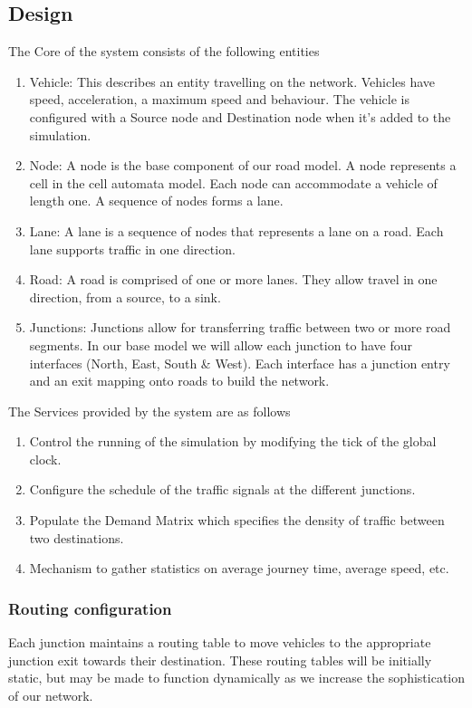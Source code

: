 \documentclass[11pt]{article}
\begin{document}
	\subsection{Design}
		\label{secarch}
	The Core of the system consists of the following entities
	\begin{enumerate}
		\item Vehicle: This describes an entity travelling on the network. Vehicles have speed, acceleration, a maximum speed and behaviour. The vehicle is configured with a Source node and Destination node when it's added to the simulation. 
		
		\item Node: A node is the base component of our road model. A node represents a cell in the cell automata model. Each node can accommodate a vehicle of length one. A sequence of nodes forms a lane.
		
		\item Lane: A lane is a sequence of nodes that represents a lane on a road. Each lane supports traffic in one direction.
		
		\item Road: A road is comprised of one or more lanes. They allow travel in one direction, from a source, to a sink.
		
		\item Junctions: Junctions allow for transferring traffic between two or more road segments. In our base model we will allow each junction to have four interfaces (North, East, South \& West). Each interface has a junction entry and an exit mapping onto roads to build the network.
	\end{enumerate}
	The Services provided by the system are as follows
	\begin{enumerate}
		\item Control the running of the simulation by modifying the tick of the global clock.
		
		\item Configure the schedule of the traffic signals at the different junctions.
		
		\item Populate the Demand Matrix which specifies the density of traffic between two destinations.
		
		\item Mechanism to gather statistics on average journey time, average speed, etc.
	\end{enumerate}
	
	\subsubsection{Routing configuration}
		Each junction maintains a routing table to move vehicles to the appropriate junction exit towards their destination. These routing tables will be initially static, but may be made to function dynamically as we increase the sophistication of our network.
		
\end{document}

